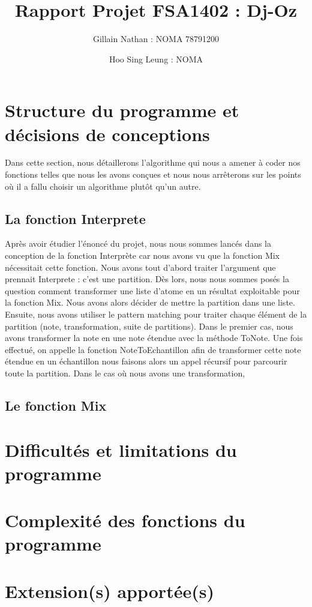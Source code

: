 \documentclass[a4paper,12pt]{article}
\title{Rapport Projet FSA1402 : Dj-Oz}
\author{Gillain Nathan : NOMA 78791200 \and Hoo Sing Leung : NOMA }
\begin{document}
\maketitle
\tableofcontents


\section{Structure du programme et décisions de conceptions}

Dans cette section, nous détaillerons l'algorithme qui nous a amener à coder nos fonctions telles que nous les avons conçues
et nous nous arrêterons sur les points où il a fallu choisir un algorithme plutôt qu'un autre.

\subsection{La fonction Interprete}

Après avoir étudier l'énoncé du projet, nous nous sommes lancés dans la conception de la fonction Interprète car nous avons vu
que la fonction Mix nécessitait cette fonction. 
Nous avons tout d'abord traiter l'argument que prennait Interprete : c'est une partition. Dès lors, nous nous sommes posés la 
question comment transformer une liste d'atome en un résultat exploitable pour la fonction Mix. Nous avons alors décider 
de mettre la partition dans une liste. Ensuite, nous avons utiliser le pattern matching pour traiter chaque élément de la 
partition (note, transformation, suite de partitions). Dans le premier cas, nous avons transformer la note en une note étendue
avec la méthode ToNote. Une fois effectué, on appelle la fonction NoteToEchantillon afin de transformer cette note étendue en
un échantillon nous faisons alors un appel récursif pour parcourir toute la partition. Dans le cas où nous avons une 
transformation,
\subsection{Le fonction Mix}

\section{Difficultés et limitations du programme}

\section{Complexité des fonctions du programme}

\section{Extension(s) apportée(s)}
\end{document}
